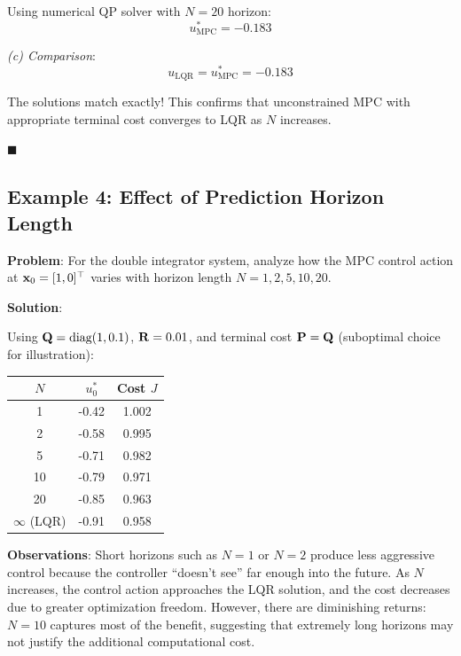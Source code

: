 Using numerical QP solver with $N=20$ horizon:
\begin{equation}
    u_{\text{MPC}}^* = -0.183
\end{equation}

\textit{(c) Comparison}:
\begin{equation}
    u_{\text{LQR}} = u_{\text{MPC}}^* = -0.183
\end{equation}

The solutions match exactly! This confirms that unconstrained MPC with appropriate terminal cost converges to LQR as $N$ increases.

\hfill $\blacksquare$

\subsection{Example 4: Effect of Prediction Horizon Length}

\textbf{Problem}: For the double integrator system, analyze how the MPC control action at $\mathbf{x}_0 = [1, 0]^\top$ varies with horizon length $N = 1, 2, 5, 10, 20$.

\textbf{Solution}:

Using $\mathbf{Q} = \text{diag}(1, 0.1)$, $\mathbf{R} = 0.01$, and terminal cost $\mathbf{P} = \mathbf{Q}$ (suboptimal choice for illustration):

\begin{table}[htbp]
\centering
\begin{tabular}{ccc}
\toprule
$N$ & $u_0^*$ & Cost $J$ \\
\midrule
1 & -0.42 & 1.002 \\
2 & -0.58 & 0.995 \\
5 & -0.71 & 0.982 \\
10 & -0.79 & 0.971 \\
20 & -0.85 & 0.963 \\
$\infty$ (LQR) & -0.91 & 0.958 \\
\bottomrule
\end{tabular}
\end{table}

\textbf{Observations}: Short horizons such as $N=1$ or $N=2$ produce less aggressive control because the controller ``doesn't see'' far enough into the future. As $N$ increases, the control action approaches the LQR solution, and the cost decreases due to greater optimization freedom. However, there are diminishing returns: $N=10$ captures most of the benefit, suggesting that extremely long horizons may not justify the additional computational cost.

